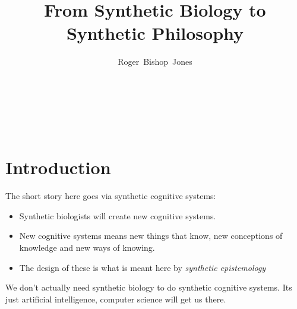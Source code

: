 \documentclass[14pt,titlepage]{extarticle}
\title{From Synthetic Biology to Synthetic Philosophy}
\author{Roger~Bishop~Jones}
\date{\ }
\newcommand{\ignore}[1]{}
\begin{document}

                               
\begin{titlepage}
\maketitle





\end{titlepage}

\ \

\ignore{
\begin{centering}
{\LARGE \bf From \\Synthetic Biology \\to \\Synthetic Philosophy\\}
\end{centering}
}%

\setcounter{tocdepth}{1}
{\parskip-0pt\tableofcontents}




\section{Introduction}

The short story here goes via synthetic cognitive systems:
\begin{itemize}
\item Synthetic biologists will create new cognitive systems.
\item New cognitive systems means new things that know, new conceptions of knowledge and new ways of knowing.
\item The design of these is what is meant here by {\it synthetic epistemology}
\end{itemize}

We don't actually need synthetic biology to do synthetic cognitive systems.
Its just artificial intelligence, computer science will get us there.
\end{document}
